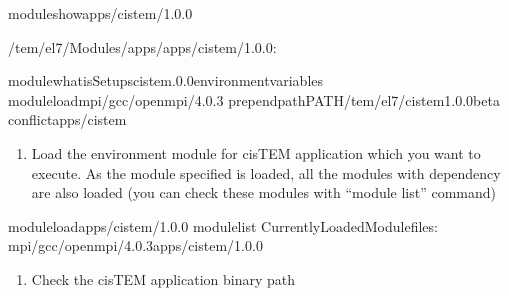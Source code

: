 \documentclass[a4paper,11pt,english]{sphinxmanual}
\begin{document}
\begin{sphinxVerbatim}[commandchars=\\\{\}]
\PYGZdl{}\PYGZgt{}moduleshowapps/cistem/1.0.0

\PYGZhy{}\PYGZhy{}\PYGZhy{}\PYGZhy{}\PYGZhy{}\PYGZhy{}\PYGZhy{}\PYGZhy{}\PYGZhy{}\PYGZhy{}\PYGZhy{}\PYGZhy{}\PYGZhy{}\PYGZhy{}\PYGZhy{}\PYGZhy{}\PYGZhy{}\PYGZhy{}\PYGZhy{}\PYGZhy{}\PYGZhy{}\PYGZhy{}\PYGZhy{}\PYGZhy{}\PYGZhy{}\PYGZhy{}\PYGZhy{}\PYGZhy{}\PYGZhy{}\PYGZhy{}\PYGZhy{}\PYGZhy{}\PYGZhy{}\PYGZhy{}\PYGZhy{}\PYGZhy{}\PYGZhy{}\PYGZhy{}\PYGZhy{}\PYGZhy{}\PYGZhy{}\PYGZhy{}\PYGZhy{}\PYGZhy{}\PYGZhy{}\PYGZhy{}\PYGZhy{}\PYGZhy{}\PYGZhy{}\PYGZhy{}\PYGZhy{}\PYGZhy{}\PYGZhy{}\PYGZhy{}\PYGZhy{}\PYGZhy{}\PYGZhy{}\PYGZhy{}\PYGZhy{}\PYGZhy{}\PYGZhy{}\PYGZhy{}\PYGZhy{}\PYGZhy{}\PYGZhy{}\PYGZhy{}\PYGZhy{}
/tem/el7/Modules/apps/apps/cistem/1.0.0:

module\PYGZhy{}whatisSetupscistem.0.0environmentvariables
moduleloadmpi/gcc/openmpi/4.0.3
prepend\PYGZhy{}pathPATH/tem/el7/cistem\PYGZhy{}1.0.0\PYGZhy{}beta
conflictapps/cistem
\PYGZhy{}\PYGZhy{}\PYGZhy{}\PYGZhy{}\PYGZhy{}\PYGZhy{}\PYGZhy{}\PYGZhy{}\PYGZhy{}\PYGZhy{}\PYGZhy{}\PYGZhy{}\PYGZhy{}\PYGZhy{}\PYGZhy{}\PYGZhy{}\PYGZhy{}\PYGZhy{}\PYGZhy{}\PYGZhy{}\PYGZhy{}\PYGZhy{}\PYGZhy{}\PYGZhy{}\PYGZhy{}\PYGZhy{}\PYGZhy{}\PYGZhy{}\PYGZhy{}\PYGZhy{}\PYGZhy{}\PYGZhy{}\PYGZhy{}\PYGZhy{}\PYGZhy{}\PYGZhy{}\PYGZhy{}\PYGZhy{}\PYGZhy{}\PYGZhy{}\PYGZhy{}\PYGZhy{}\PYGZhy{}\PYGZhy{}\PYGZhy{}\PYGZhy{}\PYGZhy{}\PYGZhy{}\PYGZhy{}\PYGZhy{}\PYGZhy{}\PYGZhy{}\PYGZhy{}\PYGZhy{}\PYGZhy{}\PYGZhy{}\PYGZhy{}\PYGZhy{}\PYGZhy{}\PYGZhy{}\PYGZhy{}\PYGZhy{}\PYGZhy{}\PYGZhy{}\PYGZhy{}\PYGZhy{}\PYGZhy{}
\end{sphinxVerbatim}
\begin{enumerate}
%
\setcounter{enumi}{2}
\item {} 
\sphinxAtStartPar
Load the environment module for cisTEM  application which you want to execute. As the module specified is loaded, all the modules with dependency are also loaded (you can check these modules with “module list” command)

\end{enumerate}

\begin{sphinxVerbatim}[commandchars=\\\{\}]
\PYGZdl{}\PYGZgt{}moduleloadapps/cistem/1.0.0
\PYGZdl{}\PYGZgt{}modulelist
CurrentlyLoadedModulefiles:
mpi/gcc/openmpi/4.0.3apps/cistem/1.0.0
\end{sphinxVerbatim}
\begin{enumerate}
%
\setcounter{enumi}{3}
\item {} 
\sphinxAtStartPar
Check the cisTEM application binary path

\end{enumerate}
\end{document}
